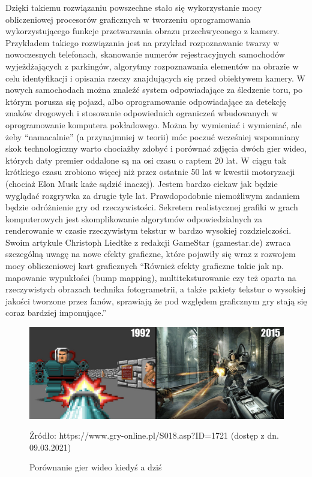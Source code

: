\documentclass{article}
\begin{document}
	\par
	Dzięki takiemu rozwiązaniu powszechne stało się wykorzystanie mocy obliczeniowej procesorów graficznych w tworzeniu oprogramowania wykorzystującego funkcje przetwarzania obrazu przechwyconego z kamery. Przykładem takiego rozwiązania jest na przykład rozpoznawanie twarzy w nowoczesnych telefonach, skanowanie numerów rejestracyjnych \linebreak samochodów wyjeżdżających z parkingów, algorytmy rozpoznawania elementów na obrazie w celu identyfikacji i opisania rzeczy znajdujących się przed obiektywem kamery. W nowych samochodach można znaleźć system odpowiadające za śledzenie toru, po którym porusza się pojazd, albo oprogramowanie odpowiadające za detekcję znaków drogowych i stosowanie odpowiednich ograniczeń wbudowanych w oprogramowanie komputera pokładowego. Można by wymieniać i wymieniać, ale żeby “namacalnie” (a przynajmniej w teorii) móc poczuć wcześniej wspomniany skok technologiczny warto chociażby zdobyć i porównać zdjęcia dwóch gier wideo, których daty premier oddalone są na osi czasu o raptem 20 lat. W ciągu tak krótkiego czasu zrobiono więcej niż przez ostatnie 50 lat w kwestii motoryzacji (chociaż Elon Musk każe sądzić inaczej). Jestem bardzo ciekaw jak będzie wyglądać rozgrywka za drugie tyle lat. Prawdopodobnie niemożliwym zadaniem będzie odróżnienie gry od rzeczywistości.
	Sekretem realistycznej grafiki w grach komputerowych jest skomplikowanie algorytmów odpowiedzialnych za renderowanie w czasie rzeczywistym tekstur w bardzo wysokiej rozdzielczości. Swoim artykule Christoph Liedtke z redakcji GameStar (gamestar.de) \cite{ref12} zwraca szczególną uwagę na nowe efekty graficzne, które pojawiły się wraz z rozwojem mocy obliczeniowej kart graficznych “Również efekty graficzne takie jak np. mapowanie wypukłości (bump mapping), multiteksturowanie czy też oparta na rzeczywistych obrazach technika fotogrametrii, a także pakiety tekstur o wysokiej jakości tworzone przez fanów, sprawiają że pod względem graficznym gry stają się coraz bardziej imponujące.”\\
	\begin{figure}
		\centering
		\includegraphics{grafika}
		\caption{Porównanie gier wideo kiedyś a dziś}
		Źródło: https://www.gry-online.pl/S018.asp?ID=1721 (dostęp z dn. 09.03.2021)
	\end{figure}
\end{document}
